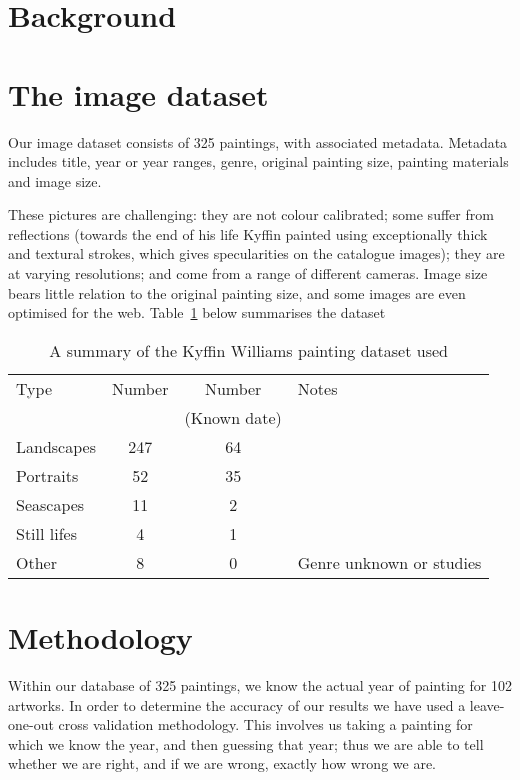 \documentclass[conference,a4paper]{IEEEtran}
\begin{document}
\section{Background}


\section{The image dataset}

Our image dataset consists of 325 paintings, with associated metadata. Metadata
includes title, year or year ranges, genre, original painting size, painting
materials and image size.

These pictures are challenging: they are not colour calibrated; some suffer
from reflections (towards the end of his life Kyffin painted using
exceptionally thick and textural strokes, which gives specularities on the
catalogue images); they are at varying resolutions; and come from a range of
different cameras. Image size bears little relation to the original painting
size, and some images are even optimised for the web.  Table~\ref{summary_t}
below summarises the dataset


\begin{table}[h]
\begin{tabular}{| l | c | c | p{3cm} |}
Type & Number & Number & Notes \\
  & & (Known date) &  \\
\hline
Landscapes  & 247 & 64 & \\
Portraits   &  52 & 35 & \\
Seascapes   &  11 &  2 & \\
Still lifes &   4 &  1 & \\
Other       &   8 &  0 & Genre unknown or studies \\
\end{tabular}
\caption{A summary of the Kyffin Williams painting dataset used}
\label{summary_t}
\end{table}

\section{Methodology}

Within our database of 325 paintings, we know the actual year of painting for 102 %
artworks. In order to determine the accuracy of our results we have used a
leave-one-out cross validation methodology. This involves us taking a painting
for which we know the year, and then guessing that year; thus we are able to
tell whether we are right, and if we are wrong, exactly how wrong we are.  
\end{document}

